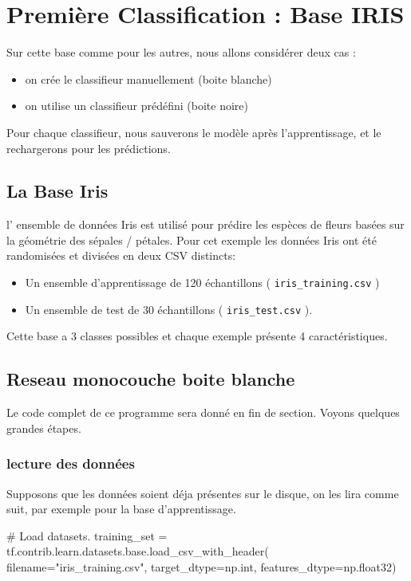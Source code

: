 \documentclass[a4paper,11pt]{book}
\begin{document}
\chapter{Première Classification : Base IRIS}

Sur cette base comme pour les autres, nous allons considérer deux cas :
\begin{itemize}
\item on crée le classifieur manuellement (boite blanche)
\item on utilise un classifieur prédéfini (boite noire)
\end{itemize}

Pour chaque classifieur, nous sauverons le modèle après l'apprentissage, et le rechargerons pour les prédictions.

\section{La Base Iris}

l' ensemble de données Iris est utilisé pour prédire les espèces de fleurs basées sur la géométrie des sépales / pétales. Pour cet exemple  les données Iris ont été randomisées et divisées en deux CSV distincts:
\begin {itemize}
\item Un ensemble d'apprentissage de 120 échantillons ( \verb+iris_training.csv+ )
\item	Un ensemble de test de 30 échantillons ( \verb+iris_test.csv+ ).
\end{itemize}

Cette base a 3 classes possibles et chaque exemple présente 4 caractéristiques.

\section{Reseau monocouche boite blanche}
Le code complet de ce programme sera donné en fin de section. Voyons quelques grandes étapes.

\subsection{lecture des données}
\label{sec:irisMonocoucheRead}
Supposons que les données soient déja présentes sur le disque, on les lira comme suit, par exemple pour la base d'apprentissage.

\begin{mypython}
# Load datasets.
training_set = tf.contrib.learn.datasets.base.load_csv_with_header(
  filename="iris_training.csv",
  target_dtype=np.int,
  features_dtype=np.float32)
\end{mypython}
\end{document}
